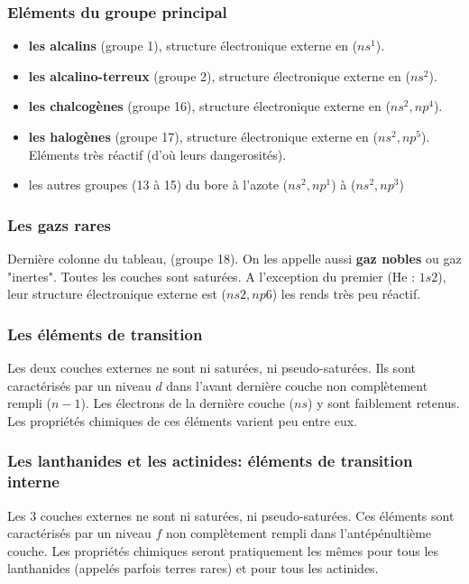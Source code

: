 \documentclass{article}
\begin{document}
\subsubsection{Eléments du groupe principal}

\begin{itemize}[label=$\ast$]
    \item  \textbf{les alcalins} (groupe 1), structure électronique externe en ($ns^1$).
    \item  \textbf{les alcalino-terreux} (groupe 2), structure électronique externe en ($ns^2$).
    \item \textbf{les chalcogènes} (groupe 16), structure électronique externe en ($ns^2, np^4$).
    \item \textbf{les halogènes} (groupe 17), structure électronique externe en ($ns^2, np^5$). 
    Eléments très réactif (d'où leurs dangerosités).
    \item les autres groupes (13 à 15) du bore à l'azote ($ns^2, np^1$) à ($ns^2, np^3$)
\end{itemize}

\subsubsection{Les gazs rares}

Dernière colonne du tableau, (groupe 18). On les appelle aussi \textbf{gaz nobles} ou gaz "inertes".
Toutes les couches sont saturées. A l'exception du premier (He : $1s2$),
leur structure électronique externe est ($ns2, np6$) les rends très peu réactif.

\subsubsection{Les éléments de transition}

Les deux couches externes ne sont ni saturées, ni pseudo-saturées. Ils sont 
caractérisés par un niveau $d$ dans l'avant dernière couche non complètement rempli ($n-1$). 
Les électrons de la dernière couche ($ns$) y sont faiblement retenus. Les propriétés chimiques de ces éléments varient peu entre eux.


\subsubsection{Les lanthanides et les actinides: éléments de transition interne}

Les 3 couches externes ne sont ni saturées, ni pseudo-saturées. Ces éléments sont 
caractérisés par un niveau $f$ non complètement rempli dans l'antépénultième couche. 
Les propriétés chimiques seront pratiquement les mêmes pour tous les lanthanides (appelés parfois terres rares) et pour tous les actinides. 
\end{document}
